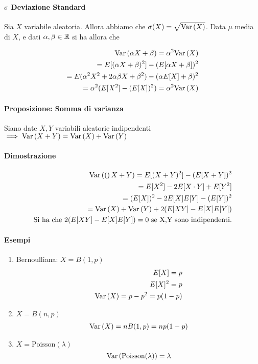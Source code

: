 \paragraph{$\sigma$ Deviazione Standard}

Sia $ X $ variabile aleatoria. Allora abbiamo che $ \sigma(X) = \sqrt{\text{Var}\left(X\right)} $. Data $ \mu $ media di $ X $, e dati $ \alpha, \beta \in \mathbb{R} $ si ha allora che

\[ \begin{aligned}
\text{Var}\left(\alpha X + \beta\right) = \alpha ^2 \text{Var}\left(X\right) \\
= E[(\alpha X + \beta)^2] - (E[\alpha X + \beta])^2 \\
= E(\alpha^2 X^2 + 2 \alpha \beta X + \beta^2) - (\alpha E[X] + \beta)^2 \\
= \alpha^2 (E[X^2] - (E[X])^2) = \alpha^2 \text{Var}\left(X\right)
\end{aligned} \]

\paragraph{Proposizione: Somma di varianza} 

Siano date $ X,Y $ variabili aleatorie indipendenti $ \implies \text{Var}\left(X + Y\right) = \text{Var}\left(X\right) + \text{Var}\left(Y\right) $ 

\paragraph{Dimostrazione} 

\[ \begin{aligned}
\text{Var}\left((\right)X+Y) = E[(X+Y)^2] - (E[X+Y])^2 \\
= E[X^2] - 2E[X \cdot Y] + E[Y^2] \\ 
= (E[X])^2 - 2E[X]E[Y] - (E[Y])^2 \\
= \text{Var}\left(X\right) + \text{Var}\left(Y\right) + 2(E[XY] - E[X]E[Y])\\
\text{Si ha che } 2(E[XY] - E[X]E[Y]) = 0 \text{ se X,Y sono indipendenti.}
\end{aligned} \]

\paragraph{Esempi}

\begin{enumerate}
	\item Bernoulliana: $ X = B(1,p) $
	\[ \begin{aligned}
	E[X] = p \\
	E[X]^2 = p \\
	\text{Var}\left(X\right) = p-p^2 = p(1-p)
	\end{aligned} \]
	
	\item $ X = B(n,p) $
	\[ \begin{aligned}
	\text{Var}\left(X\right) = nB(1,p) = np(1-p)
	\end{aligned} \]
	
	\item $ X = \text{Poisson}(\lambda) $
	\[ \text{Var}\left(\text{Poisson}(\lambda)\right) = \lambda \]
	
\end{enumerate}

